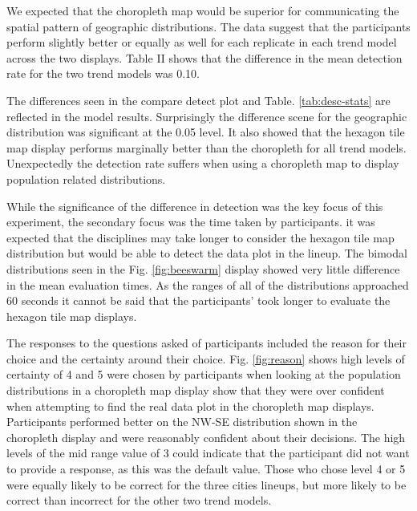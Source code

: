 \documentclass[conference,final,]{IEEEtran}
\begin{document}
We expected that the choropleth map would be superior for communicating the spatial pattern of geographic distributions. The data suggest that the participants perform slightly better or equally as well for each replicate in each trend model across the two displays. Table II shows that the difference in the mean detection rate for the two trend models was 0.10.

The differences seen in the compare detect plot and Table. \ref{tab:desc-stats} are reflected in the model results. Surprisingly the difference scene for the geographic distribution was significant at the 0.05 level.
It also showed that the hexagon tile map display performs marginally better than the choropleth for all trend models. Unexpectedly the detection rate suffers when using a choropleth map to display population related distributions.

While the significance of the difference in detection was the key focus of this experiment, the secondary focus was the time taken by participants. it was expected that the disciplines may take longer to consider the hexagon tile map distribution but would be able to detect the data plot in the lineup.
The bimodal distributions seen in the Fig. \ref{fig:beeswarm} display showed very little difference in the mean evaluation times. As the ranges of all of the distributions approached 60 seconds it cannot be said that the participants' took longer to evaluate the hexagon tile map displays.

The responses to the questions asked of participants included the reason for their choice and the certainty around their choice.
Fig. \ref{fig:reason} shows high levels of certainty of 4 and 5 were chosen by participants when looking at the population distributions in a choropleth map display show that they were over confident when attempting to find the real data plot in the choropleth map displays. Participants performed better on the NW-SE distribution shown in the choropleth display and were reasonably confident about their decisions.
The high levels of the mid range value of 3 could indicate that the participant did not want to provide a response, as this was the default value. Those who chose level 4 or 5 were equally likely to be correct for the three cities lineups, but more likely to be correct than incorrect for the other two trend models.
\end{document}
